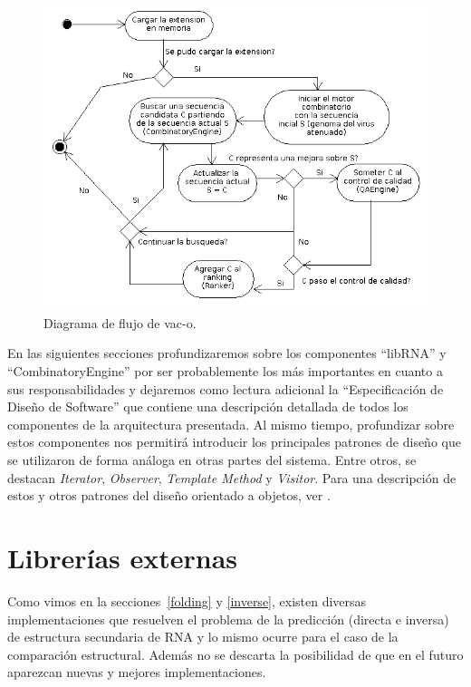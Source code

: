 \begin{figure} 
  \centering
  \includegraphics[scale=0.5]{flow.png}
  \caption{Diagrama de flujo de vac-o.}
\label{flujo}
\end{figure}

En las siguientes secciones profundizaremos sobre los componentes ``libRNA'' y
``CombinatoryEngine'' por ser probablemente los m\'as importantes en cuanto a
sus responsabilidades y dejaremos como lectura adicional la ``Especificaci\'on
de Dise\~no de Software'' que contiene una descripci\'on detallada de todos los
componentes de la arquitectura presentada. Al mismo tiempo, profundizar sobre
estos componentes nos permitir\'a introducir los principales patrones de
dise\~no que se utilizaron de forma an\'aloga en otras partes del sistema.
Entre otros, se destacan \textit{Iterator}, \textit{Observer}, \textit{Template
Method} y \textit{Visitor}. Para una descripci\'on de estos y otros patrones
del dise\~no orientado a objetos, ver \cite{Gamma95}.

\section{Librer\'ias externas}
\label{diseno-libRNA}
Como vimos en la secciones~\ref{folding} y \ref{inverse}, existen diversas
implementaciones que resuelven el problema de la predicci\'on (directa e
inversa) de estructura secundaria de \ac{RNA} y lo mismo ocurre para el caso de
la comparaci\'on estructural. Adem\'as no se descarta la posibilidad de que en
el futuro aparezcan nuevas y mejores implementaciones. 

